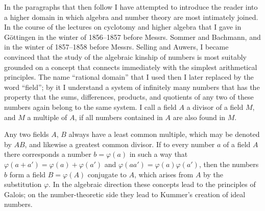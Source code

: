 \documentclass[11pt]{article}
\newcommand{\origpage}[1]{\par\vspace{0.25em}\noindent{\footnotesize\itshape [Printed page #1]}\par\vspace{0.25em}}
\begin{document}
In the paragraphs that then follow I have attempted to introduce the reader into a higher domain in which algebra and number theory are most intimately joined. In the course of the lectures on cyclotomy and higher algebra that I gave in Göttingen in the winter of 1856--1857 before Messrs. Sommer and Bachmann, and in the winter of 1857--1858 before Messrs. Selling and Auwers, I became convinced that the study of the algebraic kinship of numbers is most suitably grounded on a concept that connects immediately with the simplest arithmetical principles. The name ``rational domain'' that I used then I later replaced by the word ``field''; by it I understand a system of infinitely many numbers that has the property that the sums, differences, products, and quotients of any two of these numbers again belong to the same system. I call a field $A$ a divisor of a field $M$, and $M$ a multiple of $A$, if all numbers contained in $A$ are also found in $M$.

\origpage{401}
Any two fields $A$, $B$ always have a least common multiple, which may be denoted by $AB$, and likewise a greatest common divisor. If to every number $a$ of a field $A$ there corresponds a number $b=\varphi(a)$ in such a way that $\varphi(a+a')=\varphi(a)+\varphi(a')$ and $\varphi(aa')=\varphi(a)\varphi(a')$, then the numbers $b$ form a field $B=\varphi(A)$ conjugate to $A$, which arises from $A$ by the substitution $\varphi$. In the algebraic direction these concepts lead to the principles of Galois; on the number-theoretic side they lead to Kummer's creation of ideal numbers.
\end{document}
